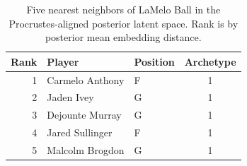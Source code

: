 \begin{table}[htbp]
  \centering\small
  \begin{tabular}{rllc}
    \toprule
    Rank & Player & Position & Archetype \\
    \midrule
    1 & Carmelo Anthony & F & 1 \\
    2 & Jaden Ivey & G & 1 \\
    3 & Dejounte Murray & G & 1 \\
    4 & Jared Sullinger & F & 1 \\
    5 & Malcolm Brogdon & G & 1 \\
    \bottomrule
  \end{tabular}
  \caption{Five nearest neighbors of LaMelo Ball in the Procrustes-aligned posterior latent space. Rank is by posterior mean embedding distance.}
  \label{tab:LaMelo_Ball_neighbors}
\end{table}

